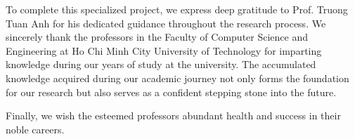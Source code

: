 To complete this specialized project, we express deep gratitude to Prof. Truong Tuan Anh for his dedicated guidance throughout the research process. We sincerely thank the professors in the Faculty of Computer Science and Engineering at Ho Chi Minh City University of Technology for imparting knowledge during our years of study at the university. The accumulated knowledge acquired during our academic journey not only forms the foundation for our research but also serves as a confident stepping stone into the future.

Finally, we wish the esteemed professors abundant health and success in their noble careers.
